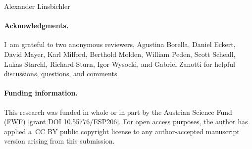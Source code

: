 \begin{artengenv}{Alexander Linsbichler}
\paragraph{Acknowledgments.}
I~am grateful to two anonymous reviewers, Agustina Borella, Daniel Eckert, David Mayer, Karl Milford, Berthold Molden, William Peden, Scott Scheall, Lukas Starchl, Richard Sturn, Igor Wysocki, and Gabriel Zanotti for helpful discussions, questions, and comments.



\paragraph{Funding information.} This research was funded in whole or in part by the Austrian Science Fund (FWF) [grant DOI {10.55776/ESP206}]. For open access purposes, the author has applied a~CC BY public copyright license to any author-accepted manuscript version arising from this submission.

\end{artengenv}
\label{linsbichler-last}
